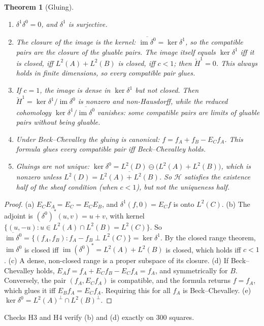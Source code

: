 \documentclass[11pt]{article}
\newtheorem{theorem}{Theorem}[section]
\theoremstyle{definition}
\begin{document}
\begin{theorem}[Gluing]\label{thm:gluing}
\begin{enumerate}[label=(\alph*)]
\item $\delta^1\delta^0=0$, and $\delta^1$ is surjective.
\item The \emph{closure} of the image is the kernel: $\overline{\operatorname{im}\delta^0}=\ker\delta^1$, so the compatible pairs are the
  closure of the gluable pairs. The image itself equals $\ker\delta^1$ iff it is closed, iff $L^2(A)+L^2(B)$ is closed, iff $c<1$; then
  $\check H^1=0$. This always holds in finite dimensions, so every compatible pair glues.
\item If $c=1$, the image is dense in $\ker\delta^1$ but not closed. Then $\check H^1=\ker\delta^1/\operatorname{im}\delta^0$ is nonzero
  and non-Hausdorff, while the reduced cohomology $\ker\delta^1/\overline{\operatorname{im}\delta^0}$ vanishes: some compatible pairs
  are limits of gluable pairs without being gluable.
\item Under Beck--Chevalley the gluing is canonical: $f=f_A+f_B-E_Cf_A$. This formula glues every compatible pair iff
  Beck--Chevalley holds.
\item Gluings are not unique: $\ker\delta^0=L^2(D)\ominus\big(L^2(A)+L^2(B)\big)$, which is nonzero unless
  $L^2(D)=\overline{L^2(A)+L^2(B)}$. So $\mathcal H$ satisfies the existence half of the sheaf condition (when $c<1$), but not the
  uniqueness half.
\end{enumerate}
\end{theorem}
\begin{proof}
(a) $E_CE_A=E_C=E_CE_B$, and $\delta^1(f,0)=E_Cf$ is onto $L^2(C)$.
(b) The adjoint is $(\delta^0)^*(u,v)=u+v$, with kernel $\{(u,-u):u\in L^2(A)\cap L^2(B)=L^2(C)\}$. So
$\overline{\operatorname{im}\delta^0}=\{(f_A,f_B):f_A-f_B\perp L^2(C)\}=\ker\delta^1$. By the closed range theorem,
$\operatorname{im}\delta^0$ is closed iff $\operatorname{im}(\delta^0)^*=L^2(A)+L^2(B)$ is closed, which holds iff $c<1$
\cite{Deutsch2001}.
(c) A dense, non-closed range is a proper subspace of its closure.
(d) If Beck--Chevalley holds, $E_Af=f_A+E_Cf_B-E_Cf_A=f_A$, and symmetrically for $B$. Conversely, the pair $(f_A,E_Cf_A)$ is
compatible, and the formula returns $f=f_A$, which glues it iff $E_Bf_A=E_Cf_A$. Requiring this for all $f_A$ is Beck--Chevalley.
(e) $\ker\delta^0=L^2(A)^\perp\cap L^2(B)^\perp$.
\end{proof}

Checks H3 and H4 verify (b) and (d) exactly on 300 squares.
\end{document}
